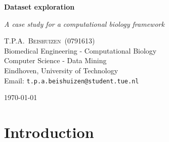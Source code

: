 \documentclass[10pt,a4paper]{article}
\newcommand{\documenttitle}{Dataset exploration}
\newcommand{\documentsubtitle}{A case study for a computational biology framework}
\begin{document}
	
	\begin{titlepage}
		
		\center
		
		\vspace*{3cm}
		
		\textbf{\huge \documenttitle}
		
		\textit{\LARGE \documentsubtitle}
		
		\vspace*{2cm}
		
		\large
		\centering
		T.P.A.~\textsc{Beishuizen}~(0791613)\\
		Biomedical Engineering - Computational Biology\\
		Computer Science - Data Mining\\
		Eindhoven, University of Technology\\
		Email: \texttt{t.p.a.beishuizen@student.tue.nl}
		
		\vfill
		
		\vspace*{1cm}
		
		\today
		
	\end{titlepage}
	
	\tableofcontents
	
	
	\pagestyle{fancy}
	\fancyhead{} %
	\fancyfoot{} %
	\renewcommand{\headrulewidth}{0.4pt}
	\renewcommand{\footrulewidth}{0.4pt}
	
	\fancyhead[L]{\rightmark}
	\fancyfoot[C]{\thepage}
	
	
	\clearpage
	
	\section{Introduction}
	\label{sec:Introduction}
	
\end{document}
